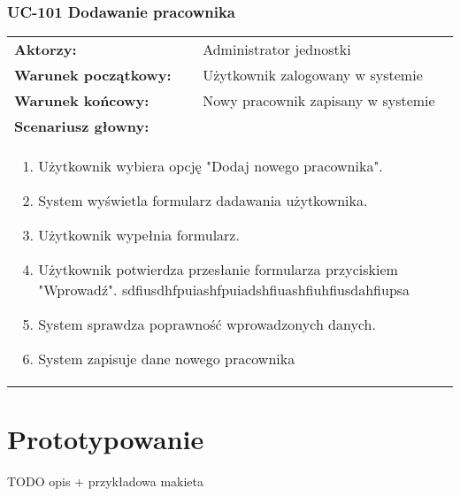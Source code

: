 \subsubsection{UC-101 Dodawanie pracownika}
\begin{tabular}{ll}
	\textbf{Aktorzy:} & Administrator jednostki \\
	\textbf{Warunek początkowy:} & Użytkownik zalogowany w systemie \\
	\textbf{Warunek końcowy:} & Nowy pracownik zapisany w systemie \\
	\multicolumn{2}{l}{\textbf{Scenariusz głowny:}}\\
	\multicolumn{2}{l}{
	\begin{minipage}{\textwidth}\begin{enumerate}
		\item Użytkownik wybiera opcję "Dodaj nowego pracownika".
		\item System wyświetla formularz dadawania użytkownika.
		\item Użytkownik wypełnia formularz.
		\item Użytkownik potwierdza przesłanie formularza przyciskiem "Wprowadź". sdfiusdhfpuiashfpuiadshfiuashfiuhfiusdahfiupsa
		\item System sprawdza poprawność wprowadzonych danych.
		\item System zapisuje dane nowego pracownika
	\end{enumerate}\end{minipage}
	}
\end{tabular}
	
\section[Prototypowanie][Prototypowanie]{Prototypowanie}
TODO opis + przykładowa makieta

